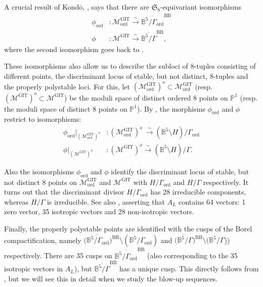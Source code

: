 \documentclass[12pt, pdftex]{amsart}
\theoremstyle{plain}
\theoremstyle{definition}
\numberwithin{equation}{section}
\def\P{{\mathbb P}}
\def\B{{\mathbb B}}
\def\SS{{\mathfrak S}}
\def\ord{\mathrm{ord}}
\def\GIT{\mathrm{GIT}}
\def\BB{\mathrm{BB}}
\def\M{\mathcal{M}}
\begin{document}
A crucial result of  Kond\={o},  \cite[Theorem 4.6]{Ko07a}, says that there are $\SS_8$-equivariant isomorphisms
\begin{align*}
    \phi_{\ord} &:\M^{\GIT}_{\ord}\xrightarrow{\sim} \overline{\B^5/\Gamma_{\ord}}^{\BB}\\
    \phi &:\M^{\GIT} \xrightarrow{\sim} \overline{\B^5/\Gamma}^{\BB},
\end{align*}
where the second isomorphism goes back to \cite{DM86}. 

These isomorphisms also allow us to describe the subloci of $8$-tuples consisting of different points, the discriminant locus of stable, but not distinct, 8-tuples and the properly polystable loci.
For this, let $(\M^{\GIT}_{\ord})^o\subset \M^{\GIT}_{\ord}$ (resp. $(\M^{\GIT})^o\subset \M^{\GIT}$) 
be the moduli space of distinct ordered 8 points on $\P^1$ (resp. the moduli space of distinct 8 points on $\P^1$).
By \cite[Theorem 3.3]{Ko07a}, the morphisms $  \phi_{\ord}$ and $\phi $ restrict to isomorphisms:
\begin{align*}
    \phi_{\ord}\vert_{(\M^{\GIT}_{\ord})^o}&:(\M^{\GIT}_{\ord})^o\  \xrightarrow{\sim} (\B^5\setminus H)/\Gamma_{\ord}\\
    \phi\vert_{(\M^{\GIT})^o}&:(\M^{\GIT})^o \xrightarrow{\sim} (\B^5\setminus H)/\Gamma.
\end{align*}

Also the isomorphisms   $\phi_{\ord}$ and $\phi$ identify the discriminant locus of stable, but not distinct 8 points on $\M_{\ord}^{\GIT}$ and $\M^{\GIT}$ with $H/\Gamma_{\ord}$ and 
$H/\Gamma$  respectively. 
It turns out that the discriminant divisor $H/\Gamma_{\ord}$ has 28 irreducible components, whereas $H/\Gamma$ is irreducible.
See also \cite[Subsection 4.2]{Ko07a}, asserting that $A_L$ contains 64 vectors: 1 zero vector, 35 isotropic vectors and 28 non-isotropic vectors.

Finally, the properly polystable points are identified with the cusps of the Borel compactification, namely 
 $\overline{(\B^5/\Gamma_{\ord}})^{\BB}\setminus(\B^5/\Gamma_{\ord})$ and $\overline{(\B^5/\Gamma})^{\BB}\setminus(\B^5/\Gamma$)) respectively.
There are 35 cusps on $\overline{\B^5/\Gamma_{\ord}}^{\BB}$ (also corresponding to the 35 isotropic vectors in $A_L$), but $\overline{\B^5/\Gamma}^{\BB}$ has a unique cusp.
This directly follows from \cite[Subsection 4.2, Proposition 4.4]{Ko07a}, but we will see this in detail when we study the blow-up sequences.
\end{document}
